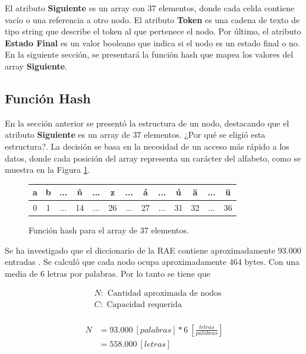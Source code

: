 \documentclass[10pt,times,twocolumn]{article}
\begin{document}
El atributo \textbf{Siguiente} es un array con 37 elementos, donde cada celda contiene vacío o una referencia a otro nodo. El atributo \textbf{Token} es una cadena de texto de tipo string que describe el token al que pertenece el nodo. Por último, el atributo \textbf{Estado Final} es un valor booleano que indica si el nodo es un estado final o no. En la siguiente sección, se presentará la función hash que mapea los valores del array \textbf{Siguiente}.

\subsection{Función Hash}
En la sección anterior se presentó la estructura de un nodo, destacando que el atributo \textbf{Siguiente} es un array de 37 elementos. ¿Por qué se eligió esta estructura?. La decisión se basa en la necesidad de un acceso más rápido a los datos, donde cada posición del array representa un carácter del alfabeto, como se muestra en la Figura \ref{fig:funcion_hash}.

\begin{figure}[H]
	\begin{tabular}{|c|c|c|c|c|c|c|c|c|c|c|c|c|}
  		\hline
		a & b & ... & ñ & ... & z & ... & á & ... & ú & ä & ... & ü \\
  		\hline
  		0 & 1 & ... & 14 & ... & 26 & ... & 27 & ... & 	31 & 32 & ... & 36 \\
  		\hline
	\end{tabular}
	\caption{Función hash para el array de 37 elementos.}
	\label{fig:funcion_hash}
\end{figure}

Se ha investigado que el diccionario de la RAE contiene aproximadamente 93.000 entradas \cite{rae2014}. Se calculó que cada nodo ocupa aproximadamente 464 bytes. Con una media de 6 letras por palabras. Por lo tanto se tiene que

\[
\begin{aligned}
& N: \text{ Cantidad aproximada de nodos} \\
& C: \text{ Capacidad requerida}\\
\end{aligned}
\]

\[
\begin{aligned}
N & = 93{.}000 \: \left[palabras\right] * 6 \: \left[\frac{letras}{palabras}\right]\\
& = 558{.}000 \: \left[letras\right]\\
&
\end{aligned}
\]
\end{document}
